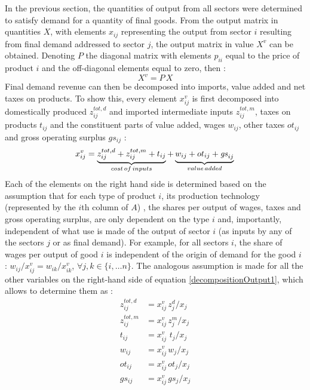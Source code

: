 \documentclass[12pt,english]{article}
\newcommand{\mli}[1]{\mathit{#1}}
\begin{document}
In the previous section, the quantities of output from all sectors were determined to satisfy demand for a quantity of final goods. From the output matrix in quantities $X$, with elements $x_{ij}$ representing the output from sector $i$ resulting from final demand addressed to sector $j$, the output matrix in value $X^v$ can be obtained. Denoting $P$ the diagonal matrix with elements $p_{ii}$ equal to the price of product $i$ and the off-diagonal elements equal to zero, then : $$X^v = P \, X$$  %
Final demand revenue can then be decomposed into imports, value added and net taxes on products. To show this, every element $x^v_{ij}$ is first decomposed into domestically produced $z^{tot,d}_{ij}$ and imported intermediate inputs $z^{tot,m}_{ij}$, taxes on products $t_{ij}$ and the constituent parts of value added, wages $w_{ij}$, other taxes $ot_{ij}$ and gross operating surplus $gs_{ij}$ :   
\begin{equation}
x^v_{ij} = \underbrace{z^{tot,d}_{ij} + z^{tot,m}_{ij} + t_{ij}}_{cost\, of\, inputs} + \underbrace{w_{ij} + ot_{ij} + \mli{gs}_{ij}}_{value\, added} \label{decompositionOutput1} \\
\end{equation}
Each of the elements on the right hand side is determined based on the assumption 
that for each type of product $i$, its production technology (represented by the $i$th column of $A$)%
, the shares per output of wages, taxes and gross operating surplus, are only dependent on the type $i$ and, importantly, independent of what use is made of the output of sector $i$ (as inputs by any of the sectors $j$ or as final demand). For example, for all sectors $i$, the share of wages per output of good $i$ is independent of the origin of demand for the good $i$ : $w_{ij}/x^v_{ij} = w_{ik}/x^v_{ik}$, $\forall j,k \in \{i, \dots n\}$. The analogous assumption is made for all the other variables on the right-hand side of equation \ref{decompositionOutput1}, %
which allows to determine them as : 
\begin{align}
z^{tot,d}_{ij} &= x^v_{ij} \, z^d_j/x_j \\
z^{tot,m}_{ij} &= x^v_{ij} \, z^m_j/x_j \label{totImports} \\
t_{ij} &= x^v_{ij} \, \, t_j/x_j \\
w_{ij} &= x^v_{ij} \, w_j/x_j \\
ot_{ij} &= x^v_{ij} \, ot_j/x_j \\
gs_{ij} &= x^v_{ij} \, gs_j/x_j
\end{align}
\end{document}
